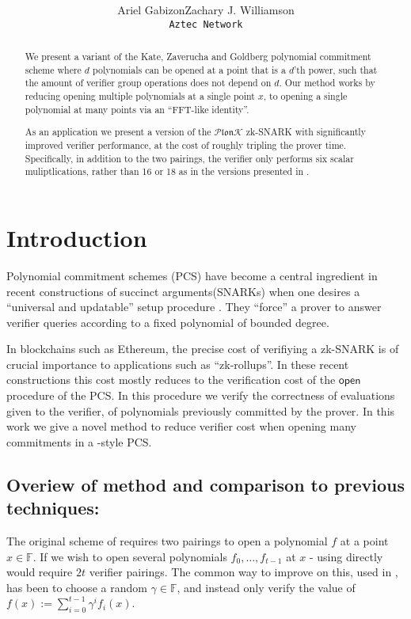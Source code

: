 \documentclass[11pt]{article} %
\title{ \bf \papertitle \\[0.72cm]}
\author{Ariel Gabizon\qquad  Zachary J. Williamson \\ \tt{Aztec Network\;\;\;}}
\newcommand{\F}{\ensuremath{\mathbb F}\xspace}
\newcommand{\open}{\ensuremath{\mathsf{open}}\xspace}
\newcommand{\defeq}{:=}
\newcommand{\plonk}{\ensuremath{\mathcal{P} \mathfrak{lon}\mathcal{K}}\xspace}
\begin{document}
    \maketitle

\begin{abstract}
We present a variant of the Kate, Zaverucha and Goldberg polynomial commitment scheme \cite{kate} where $d$ polynomials can be opened at a point that is a $d$'th power, such that the amount of verifier group operations does not depend on $d$.
Our method works by reducing opening multiple polynomials at a single point $x$, to opening a single polynomial at many points via an ``FFT-like identity''.

As an application we present a version of the \plonk zk-SNARK\cite{plonk} with significantly improved verifier performance, at the cost of roughly tripling the prover time. Specifically, in addition to the two pairings, the verifier only performs six scalar muliptlications, rather than 16 or 18 as in the versions presented in \cite{plonk}.
\end{abstract}

\section{Introduction}

Polynomial commitment schemes (PCS)\cite{kate} have become a central ingredient in recent constructions of succinct arguments(SNARKs) \cite{sonic,auroralight, marlin,plonk,supersonic} when one desires a ``universal and updatable'' setup procedure \cite{firstUniversal}.
They ``force'' a prover to answer verifier queries according to a fixed polynomial of bounded degree.

In blockchains such as Ethereum, the precise cost of verifiying a zk-SNARK is of crucial importance to applications such as ``zk-rollups''\cite{rollups}. In these recent constructions this cost mostly reduces to the verification cost of the \open procedure of the PCS. 
In this procedure we verify the correctness of evaluations given to the verifier, of polynomials previously committed by the prover.
In this work we give a novel method to reduce verifier cost when opening many commitments in a \cite{kate}-style PCS. 

\subsection{Overiew  of method and comparison to previous techniques:}
The original scheme of \cite{kate} requires two pairings to open a polynomial $f$ at a point $x\in \F$.
If we wish to open several polynomials $f_0,\ldots,f_{t-1}$ at $x$ - using \cite{kate} directly would require $2t$ verifier pairings. 
The common way to improve on this, used in \cite{sonic,marlin,plonk}, has been to choose a random $\gamma \in \F$,
and instead only verify the value of $f(x)\defeq \sum^{t-1}_{i=0} \gamma^i f_i(x)$.
\end{document}
